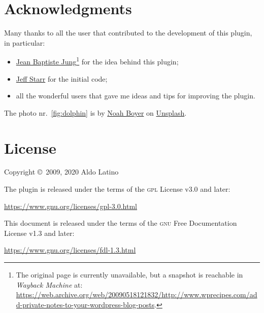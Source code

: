 	\section*{Acknowledgments}

	Many thanks to all the user that contributed to the development of this
	plugin, in particular:

	\begin{itemize}
		\item
		\href{http://www.wprecipes.com/add-private-notes-to-your-wordpress-blog-posts}{Jean
		Baptiste Jung}\footnote{The original page is currently unavailable, but a
		snapshot is reachable in \emph{Wayback Machine} at:
		\url{https://web.archive.org/web/20090518121832/http://www.wprecipes.com/add-private-notes-to-your-wordpress-blog-posts}.}
		for the idea behind this plugin;
		\item \href{http://digwp.com/2010/05/private-content-posts-shortcode}{Jeff Starr}
		for the initial code;
		\item all the wonderful users that gave me ideas and tips for improving
		the plugin.
	\end{itemize}

	The photo nr.~\vref{fig:dolphin} is by \href{https://unsplash.com/@emerald_}{Noah
	Boyer} on \href{https://unsplash.com}{Unsplash}.

	\section*{License}

	Copyright \copyright~2009, 2020  Aldo Latino

	\noindent The plugin is released under the terms of the \textsc{gpl} License
	v3.0 and later:

	\begin{center}
		\url{https://www.gnu.org/licenses/gpl-3.0.html}
	\end{center}

	\noindent This document is released under the terms of the \textsc{gnu} Free
	Documentation License v1.3 and later:

	\begin{center}
		\url{https://www.gnu.org/licenses/fdl-1.3.html}
	\end{center}
\endgroup